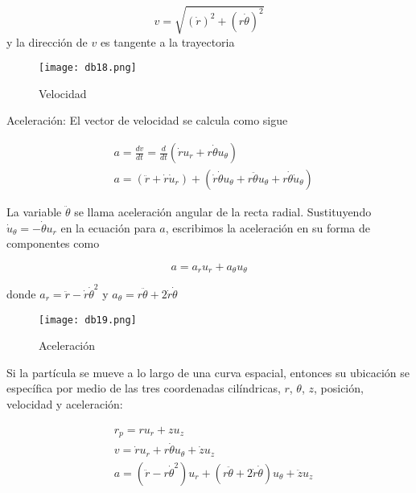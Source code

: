 \begin{equation}
    v=\sqrt{(\dot{r})^2+(r\dot{\theta})^2}
\end{equation}
y la dirección de $v$ es tangente a la trayectoria

\begin{figure}[h!]
  \centerline{\texttt{[image: db18.png]}}
  \caption{Velocidad}
  \label{db18}
\end{figure}

Aceleración: El vector de velocidad se calcula como sigue

\begin{align*}
    &a=\frac{dv}{dt}=\frac{d}{dt}\left(\dot{r}u_r+r\dot{\theta}u_{\theta}\right)\\
    &a=\left(\ddot{r}+\dot{r}\dot{u}_r\right)+\left(\dot{r}\dot{\theta}u_{\theta}+r\ddot{\theta}u_{\theta}+r\dot{\theta}\dot{u}_{\theta}\right)
\end{align*}

La variable $\ddot{\theta}$ se llama aceleración angular de la recta radial. Sustituyendo $\dot{u}_{\theta}=-\dot{\theta}u_r$ en la ecuación para $a$, escribimos la aceleración en su forma de componentes como

\begin{equation}
    a=a_ru_r+a_{\theta}u_{\theta}
\end{equation}

donde $a_r=\ddot{r}-\dot{r}\dot{\theta}^2$ y $a_{\theta}=r\ddot{\theta}+2\dot{r}\dot{\theta}$

\begin{figure}[h!]
  \centerline{\texttt{[image: db19.png]}}
  \caption{Aceleración}
  \label{db19}
\end{figure}


\begin{definition}
    Si la partícula se mueve a lo largo de una curva espacial, entonces su ubicación se específica por medio de las tres coordenadas cilíndricas, $r$, $\theta$, $z$, posición, velocidad y aceleración:
\end{definition}

\begin{align}
    &r_p=ru_r+zu_z\\
    &v=\dot{r}u_r+r\dot{\theta}u_{\theta}+\dot{z}u_z\\
    &a=\left(\ddot{r}-r\dot{\theta}^2\right)u_r+\left(r\ddot{\theta}+2\dot{r}\dot{\theta}\right)u_{\theta}+\ddot{z}u_z
\end{align}

